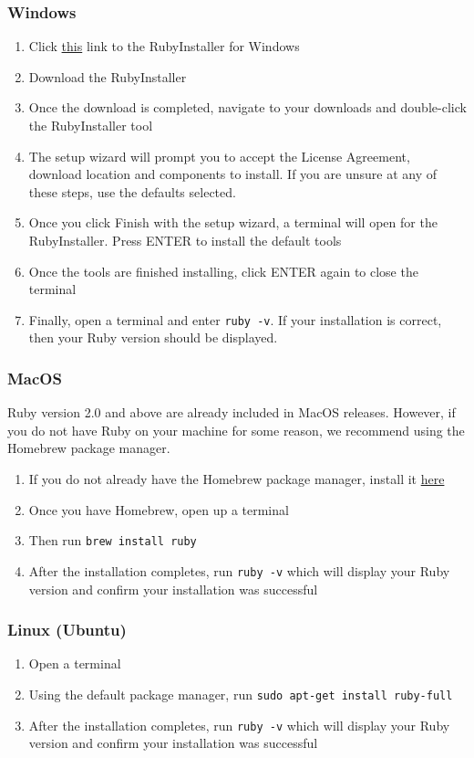 \documentclass{article}
\begin{document}
  \subsubsection{Windows}
    \begin{enumerate}
      \item Click \href{https://rubyinstaller.org/}{this} link to the RubyInstaller for Windows
      \item Download the RubyInstaller
      \item Once the download is completed, navigate to your downloads and double-click the RubyInstaller tool
      \item The setup wizard will prompt you to accept the License Agreement, download location and components to install. If you are unsure at any of these steps, use the defaults selected.
      \item Once you click Finish with the setup wizard, a terminal will open for the RubyInstaller. Press ENTER to install the default tools
      \item Once the tools are finished installing, click ENTER again to close the terminal
      \item Finally, open a terminal and enter \verb|ruby -v|. If your installation is correct, then your Ruby version should be displayed.
    \end{enumerate}

  \subsubsection{MacOS}
    Ruby version 2.0 and above are already included in MacOS releases. However, if you do not have Ruby on your machine for some reason, we recommend using the Homebrew package manager.
    \begin{enumerate}
      \item If you do not already have the Homebrew package manager, install it \href{https://brew.sh/}{here}
      \item Once you have Homebrew, open up a terminal
      \item Then run \verb|brew install ruby|
      \item After the installation completes, run \verb|ruby -v| which will display your Ruby version and confirm your installation was successful
    \end{enumerate}

  \subsubsection{Linux (Ubuntu)}
    \begin{enumerate}
      \item Open a terminal
      \item Using the default package manager, run \verb|sudo apt-get install ruby-full|
      \item After the installation completes, run \verb|ruby -v| which will display your Ruby version and confirm your installation was successful
    \end{enumerate}
\end{document}
